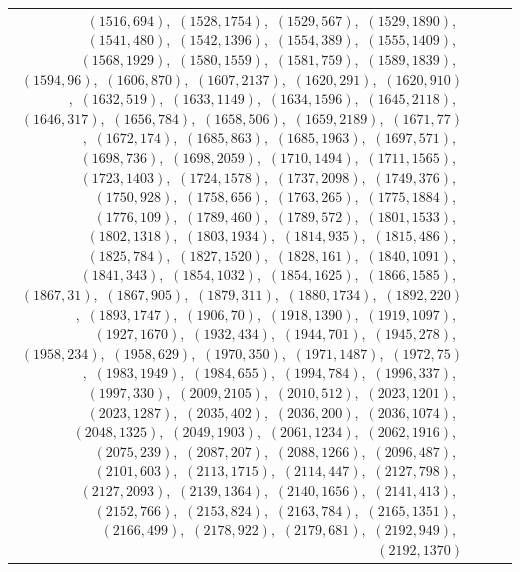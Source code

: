 \documentclass[11pt]{article}
\begin{document}
\begin{longtable}{@{}rrl>{\raggedright\arraybackslash}p{}@{}}
$(1516,694)$,\allowbreak\ $(1528,1754)$,\allowbreak\ $(1529,567)$,\allowbreak\ $(1529,1890)$,\allowbreak\ $(1541,480)$,\allowbreak\ $(1542,1396)$,\allowbreak\ $(1554,389)$,\allowbreak\ $(1555,1409)$,\allowbreak\ $(1568,1929)$,\allowbreak\ $(1580,1559)$,\allowbreak\ $(1581,759)$,\allowbreak\ $(1589,1839)$,\allowbreak\ $(1594,96)$,\allowbreak\ $(1606,870)$,\allowbreak\ $(1607,2137)$,\allowbreak\ $(1620,291)$,\allowbreak\ $(1620,910)$,\allowbreak\ $(1632,519)$,\allowbreak\ $(1633,1149)$,\allowbreak\ $(1634,1596)$,\allowbreak\ $(1645,2118)$,\allowbreak\ $(1646,317)$,\allowbreak\ $(1656,784)$,\allowbreak\ $(1658,506)$,\allowbreak\ $(1659,2189)$,\allowbreak\ $(1671,77)$,\allowbreak\ $(1672,174)$,\allowbreak\ $(1685,863)$,\allowbreak\ $(1685,1963)$,\allowbreak\ $(1697,571)$,\allowbreak\ $(1698,736)$,\allowbreak\ $(1698,2059)$,\allowbreak\ $(1710,1494)$,\allowbreak\ $(1711,1565)$,\allowbreak\ $(1723,1403)$,\allowbreak\ $(1724,1578)$,\allowbreak\ $(1737,2098)$,\allowbreak\ $(1749,376)$,\allowbreak\ $(1750,928)$,\allowbreak\ $(1758,656)$,\allowbreak\ $(1763,265)$,\allowbreak\ $(1775,1884)$,\allowbreak\ $(1776,109)$,\allowbreak\ $(1789,460)$,\allowbreak\ $(1789,572)$,\allowbreak\ $(1801,1533)$,\allowbreak\ $(1802,1318)$,\allowbreak\ $(1803,1934)$,\allowbreak\ $(1814,935)$,\allowbreak\ $(1815,486)$,\allowbreak\ $(1825,784)$,\allowbreak\ $(1827,1520)$,\allowbreak\ $(1828,161)$,\allowbreak\ $(1840,1091)$,\allowbreak\ $(1841,343)$,\allowbreak\ $(1854,1032)$,\allowbreak\ $(1854,1625)$,\allowbreak\ $(1866,1585)$,\allowbreak\ $(1867,31)$,\allowbreak\ $(1867,905)$,\allowbreak\ $(1879,311)$,\allowbreak\ $(1880,1734)$,\allowbreak\ $(1892,220)$,\allowbreak\ $(1893,1747)$,\allowbreak\ $(1906,70)$,\allowbreak\ $(1918,1390)$,\allowbreak\ $(1919,1097)$,\allowbreak\ $(1927,1670)$,\allowbreak\ $(1932,434)$,\allowbreak\ $(1944,701)$,\allowbreak\ $(1945,278)$,\allowbreak\ $(1958,234)$,\allowbreak\ $(1958,629)$,\allowbreak\ $(1970,350)$,\allowbreak\ $(1971,1487)$,\allowbreak\ $(1972,75)$,\allowbreak\ $(1983,1949)$,\allowbreak\ $(1984,655)$,\allowbreak\ $(1994,784)$,\allowbreak\ $(1996,337)$,\allowbreak\ $(1997,330)$,\allowbreak\ $(2009,2105)$,\allowbreak\ $(2010,512)$,\allowbreak\ $(2023,1201)$,\allowbreak\ $(2023,1287)$,\allowbreak\ $(2035,402)$,\allowbreak\ $(2036,200)$,\allowbreak\ $(2036,1074)$,\allowbreak\ $(2048,1325)$,\allowbreak\ $(2049,1903)$,\allowbreak\ $(2061,1234)$,\allowbreak\ $(2062,1916)$,\allowbreak\ $(2075,239)$,\allowbreak\ $(2087,207)$,\allowbreak\ $(2088,1266)$,\allowbreak\ $(2096,487)$,\allowbreak\ $(2101,603)$,\allowbreak\ $(2113,1715)$,\allowbreak\ $(2114,447)$,\allowbreak\ $(2127,798)$,\allowbreak\ $(2127,2093)$,\allowbreak\ $(2139,1364)$,\allowbreak\ $(2140,1656)$,\allowbreak\ $(2141,413)$,\allowbreak\ $(2152,766)$,\allowbreak\ $(2153,824)$,\allowbreak\ $(2163,784)$,\allowbreak\ $(2165,1351)$,\allowbreak\ $(2166,499)$,\allowbreak\ $(2178,922)$,\allowbreak\ $(2179,681)$,\allowbreak\ $(2192,949)$,\allowbreak\ $(2192,1370)$\\

\end{longtable}
\end{document}
